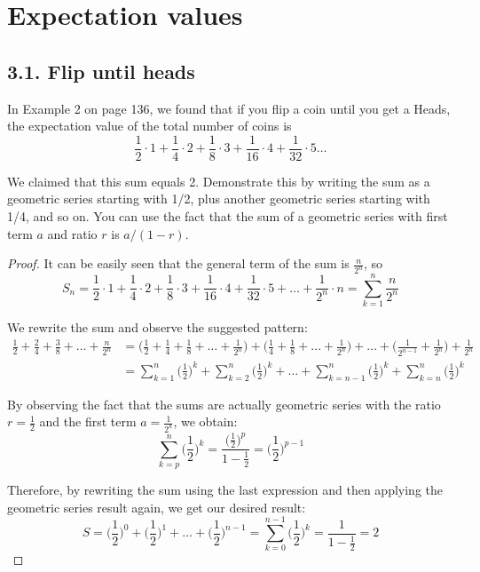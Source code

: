 \chapter*{Expectation values}

\section*{3.1. Flip until heads}
In Example 2 on page 136, we found that if you flip a coin until you get a Heads, the
expectation value of the total number of coins is
\begin{equation*}\tag{3.89}
    \frac{1}{2} \cdot 1 + \frac{1}{4} \cdot 2 + 
    \frac{1}{8} \cdot 3 + \frac{1}{16} \cdot 4 + \frac{1}{32} \cdot 5 \ldots 
\end{equation*}

We claimed that this sum equals 2. Demonstrate this by writing the sum as a
geometric series starting with 1/2, plus another geometric series starting
with 1/4, and so on. You can use the fact that the sum of a geometric series
with first term $a$ and ratio $r$ is $a/(1-r)$.

\vspace{1em}

\begin{proof}
    It can be easily seen that the general term of the sum is $\frac{n}{2^n}$, so
    \[
        S_n = \frac{1}{2} \cdot 1 + \frac{1}{4} \cdot 2 + \frac{1}{8} \cdot 3 + \frac{1}{16} \cdot 4 + 
        \frac{1}{32} \cdot 5 + \ldots + \frac{1}{2^n} \cdot n
        = \sum_{k = 1}^{n} \frac{n}{2^n}
    \] 


    We rewrite the sum and observe the suggested pattern:
    \begin{align*}
        \frac{1}{2} + \frac{2}{4} + \frac{3}{8} + \ldots + \frac{n}{2^n} 
        &= \bigg(\frac{1}{2} + \frac{1}{4} + \frac{1}{8} + \ldots + \frac{1}{2^n}\bigg)
            + \bigg(\frac{1}{4} + \frac{1}{8} + \ldots + \frac{1}{2^n}\bigg) + \ldots
            + \bigg(\frac{1}{2^{n - 1}} + \frac{1}{2^n}\bigg) + \frac{1}{2^n} \\
        &= \sum_{k = 1}^{n}\bigg(\frac{1}{2}\bigg)^k + \sum_{k = 2}^{n}\bigg(\frac{1}{2}\bigg)^k + \ldots
            + \sum_{k = n - 1}^{n}\bigg(\frac{1}{2}\bigg)^k + \sum_{k = n}^{n}\bigg(\frac{1}{2}\bigg)^k 
    \end{align*}

    By observing the fact that the sums are actually geometric series with the ratio $r = \frac{1}{2}$
    and the first term $a = \frac{1}{2^k}$, we obtain:
    \[
        \sum_{k = p}^{n} \bigg(\frac{1}{2}\bigg)^k = \frac{\big(\frac{1}{2}\big)^p}{1 - \frac{1}{2}} 
        = \bigg(\frac{1}{2}\bigg)^{p - 1}
    \] 

    Therefore, by rewriting the sum using the last expression and then applying the geometric
    series result again, we get our desired result:
    \[
        S = \bigg(\frac{1}{2}\bigg)^0 + \bigg(\frac{1}{2}\bigg)^1 + \ldots + \bigg(\frac{1}{2}\bigg)^{n - 1}
        = \sum_{k = 0}^{n - 1} \bigg(\frac{1}{2}\bigg)^k 
        = \frac{1}{1 - \frac{1}{2}} = 2
    \] 
\end{proof}

